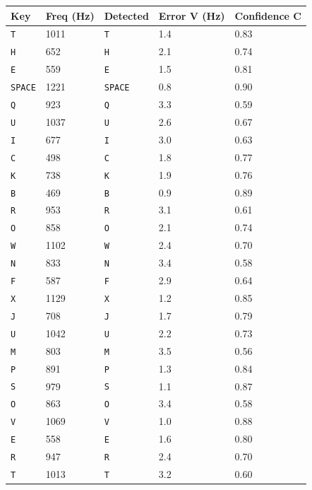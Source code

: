 \documentclass[11pt,a4paper]{article}
\newcommand{\Key}[1]{\texttt{#1}}
\begin{document}
\begin{table}[H]
    \centering
    \begin{tabular}{@{}lllll@{}}
        \toprule
        \textbf{Key} & \textbf{Freq (Hz)} & \textbf{Detected} &
        \textbf{Error V (Hz)} & \textbf{Confidence C} \\
        \midrule
        \Key{T} & 1011 & \Key{T} & 1.4 & 0.83 \\
        \Key{H} & 652 & \Key{H} & 2.1 & 0.74 \\
        \Key{E} & 559 & \Key{E} & 1.5 & 0.81 \\
        \Key{SPACE} & 1221 & \Key{SPACE} & 0.8 & 0.90 \\
        \Key{Q} & 923 & \Key{Q} & 3.3 & 0.59 \\
        \Key{U} & 1037 & \Key{U} & 2.6 & 0.67 \\
        \Key{I} & 677 & \Key{I} & 3.0 & 0.63 \\
        \Key{C} & 498 & \Key{C} & 1.8 & 0.77 \\
        \Key{K} & 738 & \Key{K} & 1.9 & 0.76 \\
        \Key{B} & 469 & \Key{B} & 0.9 & 0.89 \\
        \Key{R} & 953 & \Key{R} & 3.1 & 0.61 \\
        \Key{O} & 858 & \Key{O} & 2.1 & 0.74 \\
        \Key{W} & 1102 & \Key{W} & 2.4 & 0.70 \\
        \Key{N} & 833 & \Key{N} & 3.4 & 0.58 \\
        \Key{F} & 587 & \Key{F} & 2.9 & 0.64 \\
        \Key{X} & 1129 & \Key{X} & 1.2 & 0.85 \\
        \Key{J} & 708 & \Key{J} & 1.7 & 0.79 \\
        \Key{U} & 1042 & \Key{U} & 2.2 & 0.73 \\
        \Key{M} & 803 & \Key{M} & 3.5 & 0.56 \\
        \Key{P} & 891 & \Key{P} & 1.3 & 0.84 \\
        \Key{S} & 979 & \Key{S} & 1.1 & 0.87 \\
        \Key{O} & 863 & \Key{O} & 3.4 & 0.58 \\
        \Key{V} & 1069 & \Key{V} & 1.0 & 0.88 \\
        \Key{E} & 558 & \Key{E} & 1.6 & 0.80 \\
        \Key{R} & 947 & \Key{R} & 2.4 & 0.70 \\
        \Key{T} & 1013 & \Key{T} & 3.2 & 0.60 \\

\end{tabular}
\end{table}
\end{document}
